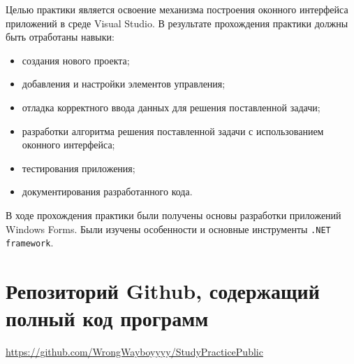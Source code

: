 \documentclass[bachelor, och, pract]{SCWorks}
\begin{document}


\tableofcontents






\intro

Целью практики является освоение механизма построения оконного интерфейса приложений в среде Visual Studio.
В результате прохождения практики должны быть отработаны навыки:
\begin{itemize}
    \item создания нового проекта;
    \item добавления и настройки элементов управления;
    \item отладка корректного ввода данных для решения поставленной задачи;
    \item разработки алгоритма решения поставленной задачи с использованием
    оконного интерфейса;
    \item тестирования приложения;
    \item документирования разработанного кода.
\end{itemize}











\conclusion

В ходе прохождения практики были получены основы разработки приложений
Windows Forms. Были изучены особенности и основные инструменты
\verb|.NET framework|.

\appendix

\section{Репозиторий Github, содержащий полный код программ}\label{app:repos}

\href{https://github.com/WrongWayboyyyy/StudyPracticePublic}{https://github.com/WrongWayboyyyy/StudyPracticePublic}
\end{document}
